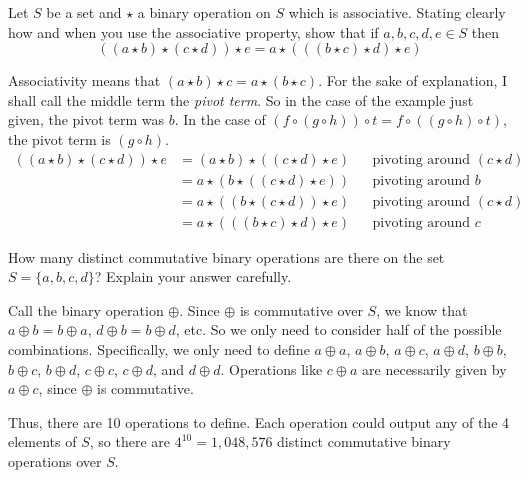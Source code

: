 \documentclass[a4paper]{article}
\begin{document}

\begin{questionbody}
Let $S$ be a set and $\star$ a binary operation on $S$ which is associative. Stating clearly how and when you use the associative property, show that if $a, b, c, d, e \in S$ then \[
((a \star b) \star (c \star d)) \star e = a \star (((b \star c) \star d) \star e)
\]
\end{questionbody}

Associativity means that $(a \star b) \star c = a \star (b \star c)$. For the sake of explanation, I shall call the middle term the \textit{pivot term}. So in the case of the example just given, the pivot term was $b$. In the case of $(f \circ (g \circ h)) \circ t = f \circ ((g \circ h) \circ t)$, the pivot term is $(g \circ h)$.
\begin{align*}
	((a \star b) \star (c \star d)) \star e &= (a \star b) \star ((c \star d) \star e) &&\text{pivoting around } (c \star d) \\[1ex]
											&= a \star (b \star ((c \star d) \star e)) &&\text{pivoting around } b \\[1ex]
											&= a \star ((b \star (c \star d)) \star e) &&\text{pivoting around } (c \star d) \\[1ex]
											&= a \star (((b \star c) \star d) \star e) &&\text{pivoting around } c
\end{align*}


\begin{questionbody}
How many distinct commutative binary operations are there on the set $S = \{a, b, c, d\}$? Explain your answer carefully.
\end{questionbody}

Call the binary operation $\oplus$. Since $\oplus$ is commutative over $S$, we know that $a \oplus b = b \oplus a$, $d \oplus b = b \oplus d$, etc. So we only need to consider half of the possible combinations. Specifically, we only need to define $a \oplus a$, $a \oplus b$, $a \oplus c$, $a \oplus d$, $b \oplus b$, $b \oplus c$, $b \oplus d$, $c \oplus c$, $c \oplus d$, and $d \oplus d$. Operations like $c \oplus a$ are necessarily given by $a \oplus c$, since $\oplus$ is commutative.

Thus, there are 10 operations to define. Each operation could output any of the 4 elements of $S$, so there are $4^{10} = 1,048,576$ distinct commutative binary operations over $S$.
\end{document}
